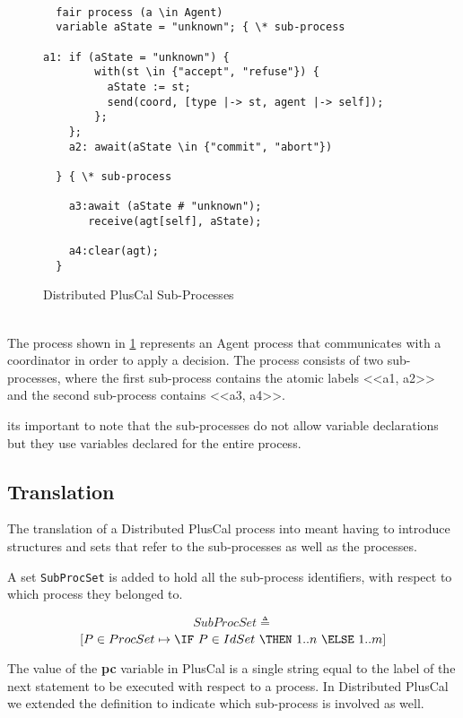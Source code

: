 \begin{figure}
\begin{lstlisting}[frame = tlrb, firstnumber = 1]
   
  fair process (a \in Agent)
  variable aState = "unknown"; { \* sub-process

a1: if (aState = "unknown") {
        with(st \in {"accept", "refuse"}) {
          aState := st;
          send(coord, [type |-> st, agent |-> self]);
        };
    };
    a2: await(aState \in {"commit", "abort"})
    
  } { \* sub-process
    
    a3:await (aState # "unknown");
       receive(agt[self], aState); 
       
    a4:clear(agt);
  }

\end{lstlisting}
\caption{Distributed PlusCal Sub-Processes}
\label{2pcSub}
\end{figure}

\hfill\\

The process shown in \ref{2pcSub} represents an Agent process that communicates with a coordinator in order to apply a decision. The process consists of two sub-processes, where the first sub-process contains the atomic labels <<a1, a2>> and the second sub-process contains <<a3, a4>>.

its important to note that the sub-processes do not allow variable declarations but they use variables declared for the entire process.

\subsection{\tlaplus Translation}

The translation of a Distributed PlusCal process into \tlaplus meant having to introduce structures and sets that refer to the sub-processes as well as the processes.

A set \verb|SubProcSet| is added to hold all the sub-process identifiers, with respect to which process they belonged to.

\[
SubProcSet \triangleq 
\]					
\[
[P \in ProcSet \mapsto \IF\ P \in IdSet\ \THEN\  1..n\ 
								\ELSE\  1..m ]
\]

The value of the \textbf{pc} variable in PlusCal is a single string equal to the label of the next statement to be executed with respect to a process. In Distributed PlusCal we extended the definition to indicate which sub-process is involved as well.

